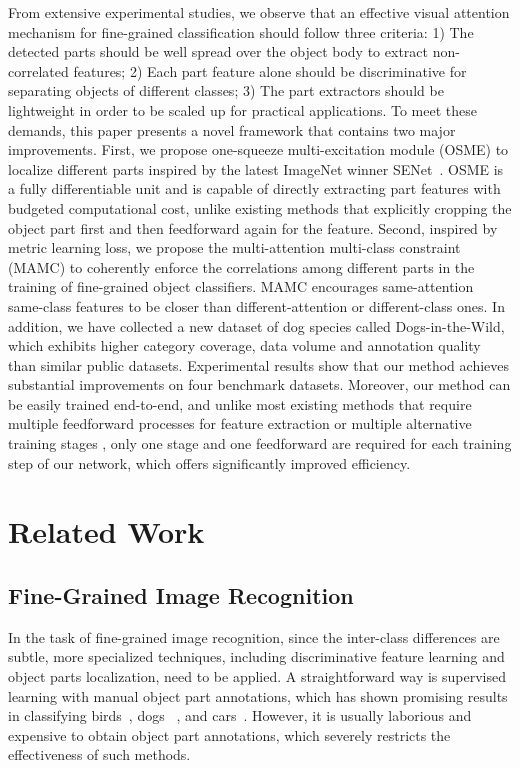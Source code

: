 \documentclass[runningheads]{llncs}
\begin{document}
From extensive experimental studies, we observe that an effective visual attention mechanism for fine-grained classification should follow three criteria:
1) The detected parts should be well spread over the object body to extract non-correlated features;
2) Each part feature alone should be discriminative for separating objects of different classes;
3) The part extractors should be lightweight in order to be scaled up for practical applications.
To meet these demands, this paper presents a novel framework that contains two major improvements.
First, we propose one-squeeze multi-excitation module (OSME) to localize different parts inspired by the latest ImageNet winner SENet~\cite{hu2017squeeze}.
OSME is a fully differentiable unit and is capable of directly extracting part features with budgeted computational cost, unlike existing methods that explicitly cropping the object part first and then feedforward again for the feature.
Second, inspired by metric learning loss, we propose the multi-attention multi-class constraint (MAMC) to coherently enforce the correlations among different parts in the training of fine-grained object classifiers. MAMC encourages same-attention same-class features to be closer than different-attention or different-class ones.
In addition, we have collected a new dataset of dog species called Dogs-in-the-Wild, which exhibits higher category coverage, data volume and annotation quality than similar public datasets.
Experimental results show that our method achieves substantial improvements on four benchmark datasets.
Moreover, our method can be easily trained end-to-end, and unlike most existing methods that require multiple feedforward processes for feature extraction \cite{wang2017residual,zhao2016diversified} or multiple alternative training stages \cite{fu2017look,rosenfeld2016visual}, only one stage and one feedforward are required for each training step of our network, which offers significantly improved efficiency.



\vspace{-.1in}
\section{Related Work}
\label{related_work}


\subsection{Fine-Grained Image Recognition}
In the task of fine-grained image recognition, since the inter-class differences are subtle, more specialized techniques, including discriminative feature learning and object parts localization, need to be applied.
A straightforward way is supervised learning with manual object part annotations, which has shown promising results in classifying birds~\cite{branson2014bird,farrell2011birdlets,zhang2014part,zhang2014panda}, dogs~ \cite{khosla2011novel,parkhi2011truth,LiuKJB12,zhang2014part}, and cars~\cite{krause2014learning,LinMHD14,krause20133d}.
However, it is usually laborious and expensive to obtain object part annotations, which severely restricts the effectiveness of such methods.
\end{document}
